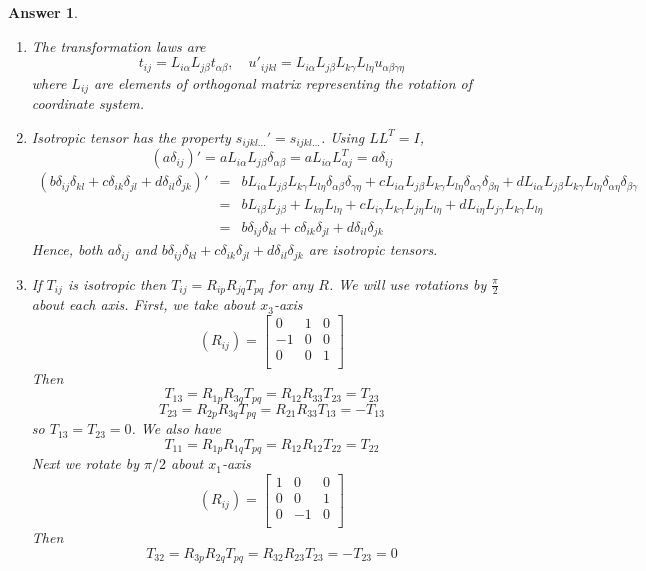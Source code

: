 \documentclass[a4paper]{article}
\newtheorem{ans}{Answer}[section]
\theoremstyle{new}
\begin{document}
\begin{ans}\leavevmode
\begin{enumerate}[label=(\roman*)]
\item The transformation laws are
$$t_{ij}=L_{i\alpha}L_{j\beta}t_{\alpha\beta}, \quad u'_{ijkl}=L_{i\alpha}L_{j\beta}L_{k\gamma}L_{l\eta}u_{\alpha\beta\gamma\eta}$$ where $L_{ij}$ are elements of orthogonal matrix representing the rotation of coordinate system.
\item Isotropic tensor has the property $s_{ijkl...}'=s_{ijkl...}$. Using $LL^T=I$,
$$(a\delta_{ij})'=aL_{i\alpha}L_{j\beta}\delta_{\alpha\beta}=aL_{i\alpha}L^T_{\alpha j}=a\delta_{ij}$$
\begin{eqnarray}
(b\delta_{ij}\delta_{kl}+c\delta_{ik}\delta_{jl}+d\delta_{il}\delta_{jk})'&=&bL_{i\alpha}L_{j\beta}L_{k\gamma}L_{l\eta}\delta_{\alpha\beta}\delta_{\gamma\eta}+cL_{i\alpha}L_{j\beta}L_{k\gamma}L_{l\eta}\delta_{\alpha\gamma}\delta_{\beta\eta}+dL_{i\alpha}L_{j\beta}L_{k\gamma}L_{l\eta}\delta_{\alpha\eta}\delta_{\beta\gamma}\nonumber\\&=&bL_{i\beta}L_{j\beta}+L_{k\eta}L_{l\eta}+cL_{i\gamma}L_{k\gamma}L_{j\eta}L_{l\eta}+dL_{i\eta}L_{j\gamma}L_{k\gamma}L_{l\eta}\nonumber\\&=&b\delta_{ij}\delta_{kl}+c\delta_{ik}\delta_{jl}+d\delta_{il}\delta_{jk}\nonumber
\end{eqnarray}
Hence, both $a\delta_{ij}$ and $b\delta_{ij}\delta_{kl}+c\delta_{ik}\delta_{jl}+d\delta_{il}\delta_{jk}$ are isotropic tensors.
\item If $T_{ij}$ is isotropic then $T_{ij}=R_{ip}R_{jq}T_{pq}$ for any $R$. We will use rotations by $\frac{\pi}{2}$ about each axis. First, we take about $x_3$-axis
    $$(R_{ij})=\begin{bmatrix}0&1&0\\-1&0&0\\0&0&1\\\end{bmatrix}$$
    Then 
    $$T_{13}=R_{1p}R_{3q}T_{pq}=R_{12}R_{33}T_{23}=T_{23}$$
    $$T_{23}=R_{2p}R_{3q}T_{pq}=R_{21}R_{33}T_{13}=-T_{13}$$
    so $T_{13}=T_{23}=0$. We also have
    $$T_{11}=R_{1p}R_{1q}T_{pq}=R_{12}R_{12}T_{22}=T_{22}$$
    Next we rotate by $\pi/2$ about $x_1$-axis
    $$(R_{ij})=\begin{bmatrix}1&0&0\\0&0&1\\0&-1&0\\\end{bmatrix}$$
    Then
    $$T_{32}=R_{3p}R_{2q}T_{pq}=R_{32}R_{23}T_{23}=-T_{23}=0$$

\end{enumerate}
\end{ans}
\end{document}
